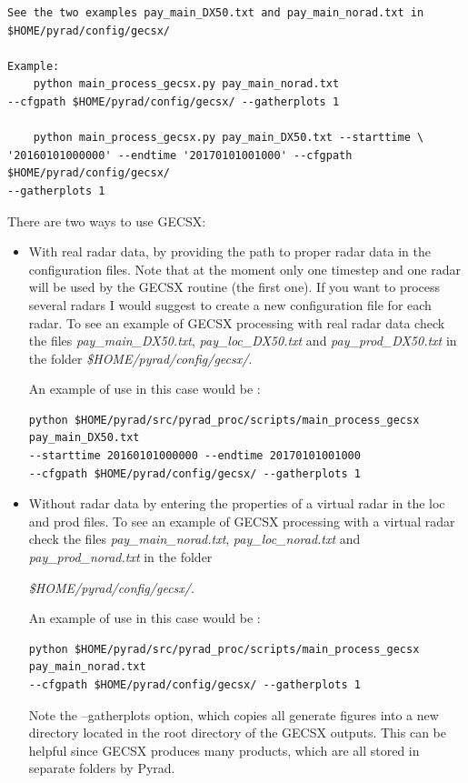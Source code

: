 \documentclass[a4paper,11pt,pdftex,twoside]{scrartcl}
\begin{document}
{{{\begin{verbatim}
See the two examples pay_main_DX50.txt and pay_main_norad.txt in
$HOME/pyrad/config/gecsx/

Example:
    python main_process_gecsx.py pay_main_norad.txt
--cfgpath $HOME/pyrad/config/gecsx/ --gatherplots 1

    python main_process_gecsx.py pay_main_DX50.txt --starttime \
'20160101000000' --endtime '20170101001000' --cfgpath $HOME/pyrad/config/gecsx/
--gatherplots 1

\end{verbatim}

There are two ways to use GECSX:

\begin{itemize}
 \item With real radar data, by providing the path to proper radar data in the configuration files. Note that at the moment only one timestep and one radar will be used by the GECSX routine (the first one). If you want to process several radars I would suggest to create a new configuration file for each radar. To see an example of GECSX processing with real radar data check the files \textit{pay\_main\_DX50.txt}, \textit{pay\_loc\_DX50.txt} and \textit{pay\_prod\_DX50.txt} in the folder \textit{\$HOME/pyrad/config/gecsx/}.
 
 An example of use in this case would be :
 \begin{verbatim}
python $HOME/pyrad/src/pyrad_proc/scripts/main_process_gecsx pay_main_DX50.txt 
--starttime 20160101000000 --endtime 20170101001000
--cfgpath $HOME/pyrad/config/gecsx/ --gatherplots 1
\end{verbatim} 
 \item Without radar data by entering the properties of a virtual radar in the loc and prod files. To see an example of GECSX processing with a virtual radar check the files \textit{pay\_main\_norad.txt}, \textit{pay\_loc\_norad.txt} and \textit{pay\_prod\_norad.txt} in the folder
 
 \textit{\$HOME/pyrad/config/gecsx/}.
 
 An example of use in this case would be :
 \begin{verbatim}
python $HOME/pyrad/src/pyrad_proc/scripts/main_process_gecsx pay_main_norad.txt 
--cfgpath $HOME/pyrad/config/gecsx/ --gatherplots 1
\end{verbatim} 
Note the --gatherplots option, which copies all generate figures into a new directory located in the root directory of the GECSX outputs. This can be helpful since GECSX produces many products, which are all stored in separate folders by Pyrad.
\end{itemize}

}}}
\end{document}
